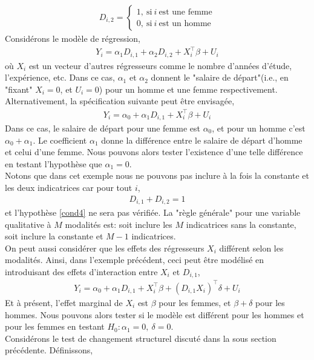 \documentclass[10pt, reqno]{amsart}
\begin{document}
\begin{align*}
D_{i, 2} = \left\{
\begin{array}{c}
1, \  \textrm{si} \  i  \ \textrm{est une femme}\\
0, \  \textrm{si} \  i  \ \textrm{est un homme}
\end{array}
\right.
\end{align*}
Considérons le modèle de régression,
\begin{align*}
Y_i  = \alpha_1D_{i,1}+\alpha_2D_{i, 2} + X_i^\top\beta + U_i
\end{align*}
où $X_i$ est un vecteur d'autres régresseurs comme le nombre d'années d'étude, l'expérience, etc. Dans ce cas, $\alpha_1$ et $\alpha_2$ donnent le "salaire de départ"(i.e., en "fixant" $X_i=0$, et $U_i = 0$) pour un homme et une femme respectivement. Alternativement, la spécification suivante peut être envisagée,
\begin{align*}
Y_i = \alpha_0 + \alpha_1D_{i, 1} + X_i^\top\beta + U_i
\end{align*}
Dans ce cas, le salaire de départ pour une femme est $\alpha_0$, et pour un homme c'est $\alpha_0+\alpha_1$. Le coefficient $\alpha_1$ donne la différence entre le salaire de départ d'homme et celui d'une femme. Nous pouvons alors tester l'existence d'une telle différence en testant l'hypothèse que $\alpha_1 = 0$.\\
Notons que dans cet exemple nous ne pouvons pas inclure à la fois la constante et les deux indicatrices car pour tout $i$,
\begin{align*}
D_{i, 1}+D_{i, 2} = 1
\end{align*}
et l'hypothèse \ref{cond4} ne sera pas vérifiée. La "règle générale" pour une variable qualitative à $M$ modalités est: soit inclure les $M$ indicatrices sans la constante, soit inclure la constante et $M-1$ indicatrices.\\
On peut aussi considérer que les effets des régresseurs $X_i$ différent selon les modalités. Ainsi, dans l'exemple précédent, ceci peut être modélisé en introduisant des effets d'interaction entre $X_i$ et $D_{i, 1}$,
\begin{align*}
Y_i = \alpha_0 + \alpha_1D_{i, 1} + X_i^\top\beta + (D_{i, 1}X_i)^\top\delta + U_i
\end{align*} 
Et à présent, l'effet marginal de $X_i$ est $\beta$ pour les femmes, et $\beta+\delta$ pour les hommes. Nous pouvons alors tester si le modèle est différent pour les hommes et pour les femmes en testant $H_0: \alpha_1 = 0, \ \delta = 0$.\\
Considérons le test de changement structurel discuté dans la sous section précédente. Définissons,
\end{document}
